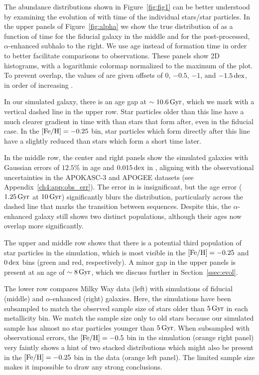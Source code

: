 The abundance distributions shown in Figure~\ref{fig:fig1} can be better understood by examining the evolution of \MgFe{} with time of the individual stars/star particles. In the upper panels of Figure~\ref{fig:alpha} we show the true distribution of \MgFe{} as a function of time for the fiducial galaxy in the middle and for the post-processed, $\alpha$-enhanced subhalo to the right. We use age instead of formation time in order to better facilitate comparisons to observations. These panels show 2D histograms, with a logarithmic colormap normalized to the maximum of the plot. To prevent overlap, the values of \MgFe{} are given offsets of $0$, $-0.5$, $-1$, and $-1.5\,\textrm{dex}$, in order of increasing \FeH{}.

In our simulated galaxy, there is an age gap at $\sim10.6\,\textrm{Gyr}$, which we mark with a vertical dashed line in the upper row. Star particles older than this line have a much clearer gradient in time with \MgFe{} than stars that form after, even in the fiducial case. In the $[\textrm{Fe}/\textrm{H}]=-0.25$ bin, star particles which form directly after this line have a slightly reduced \MgFe{} than stars which form a short time later.

In the middle row, the center and right panels show the simulated galaxies with Gaussian errors of $12.5\%$ in age and $0.015\,\textrm{dex}$ in \MgFe{}, aligning with the observational uncertainties in the APOKASC-3 and APOGEE datasets (see Appendix~\ref{ch4:app:obs_err}). The error in \MgFe{} is insignificant, but the age error ($1.25\,\textrm{Gyr}$ at $10\,\textrm{Gyr}$) significantly blurs the distribution, particularly across the dashed line that marks the transition between sequences. Despite this, the $\alpha$-enhanced galaxy still shows two distinct populations, although their ages now overlap more significantly.

The upper and middle row shows that there is a potential third population of star particles in the simulation, which is most visible in the $[\textrm{Fe}/\textrm{H}]=-0.25$ and $0\,\textrm{dex}$ bins (green and red, respectively). A minor gap in the upper panels is present at an age of $\sim8\,\textrm{Gyr}$, which we discuss further in Section~\ref{ssec:evol}.

The lower row compares Milky Way data (left) with simulations of fiducial (middle) and $\alpha$-enhanced (right) galaxies. Here, the simulations have been subsampled to match the observed sample size of stars older than $5\,\textrm{Gyr}$ in each metallicity bin. We match the sample size only to old stars because our simulated sample has almost no star particles younger than $5\,\textrm{Gyr}$. When subsampled with observational errors, the $[\textrm{Fe}/\textrm{H}]=-0.5$ bin in the simulation (orange right panel) very faintly shows a hint of two stacked distributions which might also be present in the $[\textrm{Fe}/\textrm{H}]=-0.25$ bin in the data (orange left panel). The limited sample size makes it impossible to draw any strong conclusions.

